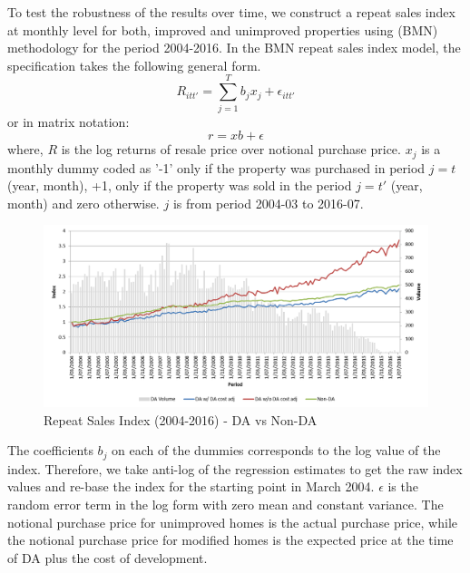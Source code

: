 \documentclass[AEJ,reqno, draftmode]{AEA} %
\begin{document}
To test the robustness of the results over time, we construct a repeat sales index at monthly level for both, improved and unimproved properties using \citet{bailey1963regression} (BMN) methodology for the period 2004-2016. In the BMN repeat sales index model, the specification takes the following general form.
\begin{equation}
    R_{itt'} = \sum\limits_{j=1}^{T} b_jx_j + \epsilon_{itt'}  
\end{equation}
or in matrix notation: $$r = xb + \epsilon$$
where, $R$ is the log returns of resale price over notional purchase price. $x_j$ is a monthly dummy coded as '-1' only if the property was purchased in period $j = t$ (year, month), +1, only if the property was sold in the period $j = t'$ (year, month) and zero otherwise. $j$ is from period 2004-03 to 2016-07. 
\begin{figure}[!htb]
    \centering
     \includegraphics[width=\columnwidth]{Figures/Repeat_sales_index_post_2004_notional_purchase2.png}
 \caption{Repeat Sales Index (2004-2016) - DA vs Non-DA}
 \label{fig:BMN_RS_index_post_2004}
\end{figure}

The coefficients $b_j$ on each of the dummies corresponds to the log value of the index. Therefore, we take anti-log of the regression estimates to get the raw index values and re-base the index for the starting point in March 2004.  $\epsilon$ is the random error term in the log form with zero mean and constant variance. The notional purchase price for unimproved homes is the actual purchase price, while the notional purchase price for modified homes is the expected price at the time of DA plus the cost of development. 
\end{document}

